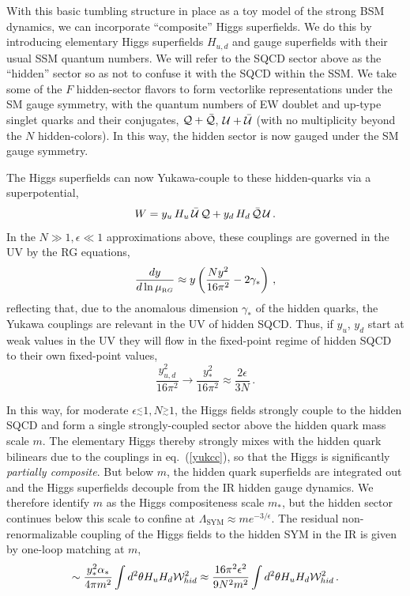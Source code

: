 \documentclass[a4paper,12pt]{article}
\newcommand{\lsim}{\stackrel{<}{_\sim}}
\newcommand{\gsim}{\stackrel{>}{_\sim}}
\def\eq#1{eq.~(\ref{#1})}
\def\eq#1{eq.~(\ref{#1})}
\def\mst{m_*}
\def\muRG{\mu_{\scriptscriptstyle{\textrm RG}}}
\begin{document}
With this basic tumbling structure in place as a toy model of the strong BSM dynamics, we can incorporate ``composite'' Higgs superfields. We do this by introducing elementary Higgs superfields ${H}_{u,d}$ and gauge superfields with their usual SSM quantum numbers. We will refer to the SQCD sector above as the ``hidden'' sector so as not to confuse it with the SQCD within the SSM. We take some of the $F$ hidden-sector flavors to form vectorlike representations under the SM gauge symmetry, with the quantum numbers of EW doublet and up-type singlet quarks and their conjugates, ${\cal Q} + \bar{{\cal Q}}$, ${\cal U} + \bar{{\cal U}}$ (with no multiplicity beyond the $N$ hidden-colors). In this way, the hidden sector is now gauged under the SM gauge symmetry.

The Higgs superfields can now Yukawa-couple to these hidden-quarks via a superpotential,
\begin{equation}
    W = y_u \,{H}_u \,\bar{{\cal U}} \,{\cal Q} + y_d \,{ H}_d \,\bar{{\cal Q}}\, {\cal U}\, .
    \label{yukcc}
\end{equation}
In the $N \gg 1, \epsilon \ll 1$ approximations above, these couplings are governed in the UV by the RG equations,
\begin{equation}
\frac{dy}{d \ln \muRG} \approx y \left( \frac{N y^2}{16 \pi^2} - 2 \gamma_*\right)\, ,
\end{equation}
reflecting that, due to the anomalous dimension $\gamma_*$ of the hidden quarks, the Yukawa couplings are relevant in the UV of hidden SQCD. Thus, if $y_u$, $y_d$ start at weak values in the UV they will flow in the fixed-point regime of hidden SQCD to their own fixed-point values,
\begin{equation}
   \frac{y^2_{u,d}}{16 \pi^2} \rightarrow \frac{y^2_*}{16 \pi^2} \approx \frac{2 \epsilon}{3 N}\, .
\end{equation}

In this way, for moderate $\epsilon \lsim 1, N \gsim 1$, the Higgs fields strongly couple to the hidden SQCD and form a single strongly-coupled sector above the hidden quark mass scale $m$. The elementary Higgs thereby strongly mixes with the hidden quark bilinears due to the couplings in \eq{yukcc}, so that the Higgs is significantly {\it partially composite}. But below $m$, the hidden quark superfields are integrated out and the Higgs superfields decouple from the IR hidden gauge dynamics. We therefore identify $m$ as the Higgs compositeness scale $\mst$,
but the hidden sector continues below this scale to confine at $\Lambda_{\textrm{SYM}} \approx m e^{- 3/ \epsilon}$. The residual non-renormalizable coupling of the Higgs fields to the hidden SYM in the IR is given by one-loop matching at $m$,
\begin{equation}
\sim \frac{y_*^2 \alpha_*}{4 \pi m^2} \int d^2 \theta {H}_u { H}_d {\cal W}^2_{hid} \approx
\frac{16 \pi^2  \epsilon^2}{9 N^2 m^2} \int d^2 \theta { H}_u { H}_d {\cal W}^2_{hid}\, .
\end{equation}
\end{document}
